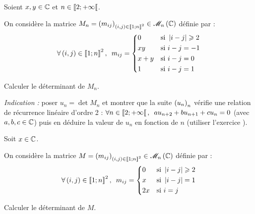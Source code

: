 \begin{corr}
\end{corr}

\begin{exo}
Soient \(x,y\in\mathbb{C}\) et \(n\in\left\llbracket2;+\infty\right\llbracket\).

On considère la matrice \(M_n=\paren{m_{ij}}_{\paren{i,j}\in\interventierii{1}{n}^2}\in\M{n}[\C]\) définie par : \[\quantifs{\forall\paren{i,j}\in\interventierii{1}{n}^2}m_{ij}=\begin{dcases}
0 &\text{si }\abs{i-j}\geq2 \\
xy &\text{si }i-j=-1 \\
x+y &\text{si }i-j=0 \\
1 &\text{si }i-j=1
\end{dcases}\]

Calculer le déterminant de \(M_n\).

\textit{Indication :} poser \(u_n=\det M_n\) et montrer que la suite \(\left(u_n\right)_n\) vérifie une relation de récurrence linéaire d'ordre 2 : \(\quantifs{\forall n\in\interventierie{2}{\pinf}}au_{n+2}+bu_{n+1}+cu_n=0\) (avec \(a,b,c\in\mathbb{C}\)) puis en déduire la valeur de \(u_n\) en fonction de \(n\) (utiliser l'exercice ).
\end{exo}

\begin{corr}
\end{corr}

\begin{exo}
Soit \(x\in\mathbb{C}\).

On considère la matrice \(M=\paren{m_{ij}}_{\paren{i,j}\in\interventierii{1}{n}^2}\in\M{n}[\C]\) définie par : \[\quantifs{\forall\paren{i,j}\in\interventierii{1}{n}^2}m_{ij}=\begin{dcases}
0 &\text{si }\abs{i-j}\geq2 \\
x &\text{si }\abs{i-j}=1 \\
2x &\text{si }i=j
\end{dcases}\]

Calculer le déterminant de \(M\).
\end{exo}

\begin{corr}
\end{corr}

